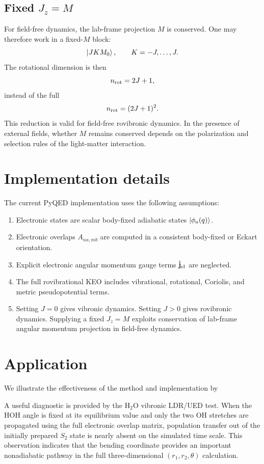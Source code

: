 \documentclass[11pt]{revtex4-2}
\begin{document}
\subsection{Fixed $J_z=M$}

For field-free dynamics, the lab-frame projection $M$ is conserved.  One may
therefore work in a fixed-$M$ block:
\begin{equation}
  \ket{J K M_0},
  \qquad
  K=-J,\ldots,J.
\end{equation}
The rotational dimension is then
\begin{equation}
  n_{\rm rot} = 2J+1,
\end{equation}
instead of the full
\begin{equation}
  n_{\rm rot} = (2J+1)^2.
\end{equation}
This reduction is valid for field-free rovibronic dynamics.  In the presence
of external fields, whether $M$ remains conserved depends on the polarization
and selection rules of the light-matter interaction.

\section{Implementation details}

The current PyQED implementation uses the following assumptions:
\begin{enumerate}
  \item Electronic states are scalar body-fixed adiabatic states
  $\ket{\phi_a(q)}$.
  \item Electronic overlaps $A_{na,mb}$ are computed in a consistent
  body-fixed or Eckart orientation.
  \item Explicit electronic angular momentum gauge terms
  $\hat{\mathbf{j}}_{\rm el}$ are neglected.
  \item The full rovibrational KEO includes vibrational, rotational,
  Coriolis, and metric pseudopotential terms.
  \item Setting $J=0$ gives vibronic dynamics.  Setting $J>0$ gives
  rovibronic dynamics.  Supplying a fixed $J_z=M$ exploits conservation of
  lab-frame angular momentum projection in field-free dynamics.
\end{enumerate}




\section{Application}

We illustrate the effectiveness of the method and implementation by 

A useful diagnostic is provided by the H$_2$O vibronic LDR/UED test.  When
the HOH angle is fixed at its equilibrium value and only the two OH stretches
are propagated using the full electronic overlap matrix, population transfer
out of the initially prepared $S_2$ state is nearly absent on the simulated
time scale.  This observation indicates that the bending coordinate provides
an important nonadiabatic pathway in the full three-dimensional
$(r_1,r_2,\theta)$ calculation.
\end{document}
